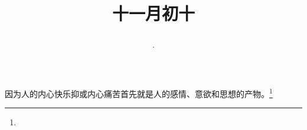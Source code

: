 \title{\date[d=10,m=12,y=2024][year:cn-y,年,month:cn,day:cn,日,·,weekday]·十一月初十 }
因为人的内心快乐抑或内心痛苦首先就是人的感情、意欲和思想的产物。\footnote{ }

